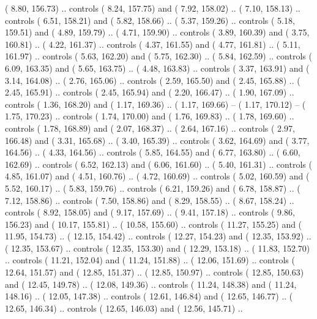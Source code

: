 {        (   8.80, 156.73) .. controls (   8.24, 157.75) and (   7.92, 158.02) ..
        (   7.10, 158.13) .. controls (   6.51, 158.21) and (   5.82, 158.66) ..
        (   5.37, 159.26) .. controls (   5.18, 159.51) and (   4.89, 159.79) ..
        (   4.71, 159.90) .. controls (   3.89, 160.39) and (   3.75, 160.81) ..
        (   4.22, 161.37) .. controls (   4.37, 161.55) and (   4.77, 161.81) ..
        (   5.11, 161.97) .. controls (   5.63, 162.20) and (   5.75, 162.30) ..
        (   5.84, 162.59) .. controls (   6.09, 163.35) and (   5.65, 163.75) ..
        (   4.48, 163.83) .. controls (   3.37, 163.91) and (   3.14, 164.08) ..
        (   2.76, 165.06) .. controls (   2.59, 165.50) and (   2.45, 165.88) ..
        (   2.45, 165.91) .. controls (   2.45, 165.94) and (   2.20, 166.47) ..
        (   1.90, 167.09) .. controls (   1.36, 168.20) and (   1.17, 169.36) ..
        (   1.17, 169.66) -- 
        (   1.17, 170.12) -- 
        (   1.75, 170.23) .. controls (   1.74, 170.00) and (   1.76, 169.83) ..
        (   1.78, 169.60) .. controls (   1.78, 168.89) and (   2.07, 168.37) ..
        (   2.64, 167.16) .. controls (   2.97, 166.48) and (   3.31, 165.68) ..
        (   3.40, 165.39) .. controls (   3.62, 164.69) and (   3.77, 164.56) ..
        (   4.33, 164.56) .. controls (   5.85, 164.55) and (   6.77, 163.80) ..
        (   6.60, 162.69) .. controls (   6.52, 162.13) and (   6.06, 161.60) ..
        (   5.40, 161.31) .. controls (   4.85, 161.07) and (   4.51, 160.76) ..
        (   4.72, 160.69) .. controls (   5.02, 160.59) and (   5.52, 160.17) ..
        (   5.83, 159.76) .. controls (   6.21, 159.26) and (   6.78, 158.87) ..
        (   7.12, 158.86) .. controls (   7.50, 158.86) and (   8.29, 158.55) ..
        (   8.67, 158.24) .. controls (   8.92, 158.05) and (   9.17, 157.69) ..
        (   9.41, 157.18) .. controls (   9.86, 156.23) and (  10.17, 155.81) ..
        (  10.58, 155.60) .. controls (  11.27, 155.25) and (  11.95, 154.73) ..
        (  12.15, 154.42) .. controls (  12.27, 154.23) and (  12.35, 153.92) ..
        (  12.35, 153.67) .. controls (  12.35, 153.30) and (  12.29, 153.18) ..
        (  11.83, 152.70) .. controls (  11.21, 152.04) and (  11.24, 151.88) ..
        (  12.06, 151.69) .. controls (  12.64, 151.57) and (  12.85, 151.37) ..
        (  12.85, 150.97) .. controls (  12.85, 150.63) and (  12.45, 149.78) ..
        (  12.08, 149.36) .. controls (  11.24, 148.38) and (  11.24, 148.16) ..
        (  12.05, 147.38) .. controls (  12.61, 146.84) and (  12.65, 146.77) ..
        (  12.65, 146.34) .. controls (  12.65, 146.03) and (  12.56, 145.71) ..
}
